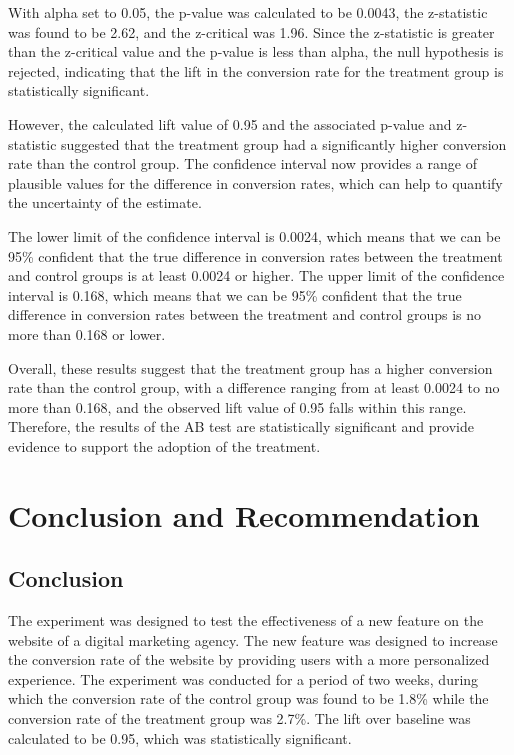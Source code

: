 \documentclass{article}
\begin{document}
With alpha set to 0.05, the p-value was calculated to be 0.0043, the z-statistic was found to be 2.62, and the z-critical was 1.96. Since the z-statistic is greater than the z-critical value and the p-value is less than alpha, the null hypothesis is rejected, indicating that the lift in the conversion rate for the treatment group is statistically significant.

However, the calculated lift value of 0.95 and the associated p-value and z-statistic suggested that the treatment group had a significantly higher conversion rate than the control group. The confidence interval now provides a range of plausible values for the difference in conversion rates, which can help to quantify the uncertainty of the estimate.

The lower limit of the confidence interval is 0.0024, which means that we can be 95\% confident that the true difference in conversion rates between the treatment and control groups is at least 0.0024 or higher. The upper limit of the confidence interval is 0.168, which means that we can be 95\% confident that the true difference in conversion rates between the treatment and control groups is no more than 0.168 or lower.

Overall, these results suggest that the treatment group has a higher conversion rate than the control group, with a difference ranging from at least 0.0024 to no more than 0.168, and the observed lift value of 0.95 falls within this range. Therefore, the results of the AB test are statistically significant and provide evidence to support the adoption of the treatment.

\section{Conclusion and Recommendation} 

\subsection{Conclusion}

The experiment was designed to test the effectiveness of a new feature on the website of a digital marketing agency. The new feature was designed to increase the conversion rate of the website by providing users with a more personalized experience. The experiment was conducted for a period of two weeks, during which the conversion rate of the control group was found to be 1.8\% while the conversion rate of the treatment group was 2.7\%. The lift over baseline was calculated to be 0.95, which was statistically significant.
\end{document}
